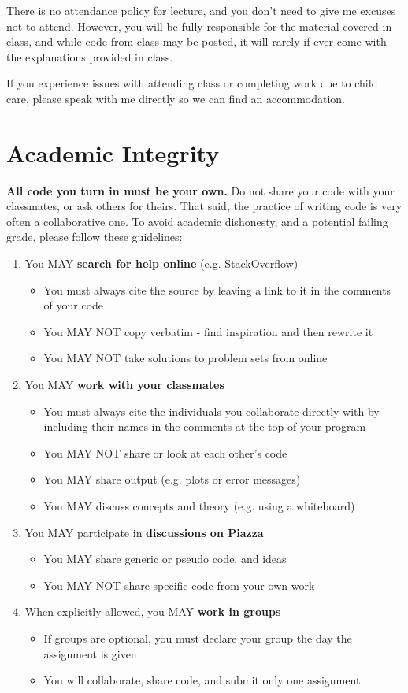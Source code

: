 \documentclass{article}
\begin{document}
There is no attendance policy for lecture, and you don't need to give me excuses not to attend.  However, you will be fully responsible for the material covered in class, and while code from class may be posted, it will rarely if ever come with the explanations provided in class.

If you experience issues with attending class or completing work due to child care, please speak with me directly so we can find an accommodation.

\section*{Academic Integrity}
\textbf{All code you turn in must be your own.}  Do not share your code with your classmates, or ask others for theirs.  That said, the practice of writing code is very often a collaborative one.  To avoid academic dishonesty, and a potential failing grade, please follow these guidelines:

\begin{enumerate}
	\item You MAY \textbf{search for help online} (e.g. StackOverflow)
	\begin{itemize}
		\item You must always cite the source by leaving a link to it in the comments of your code
		\item You MAY NOT copy verbatim - find inspiration and then rewrite it
		\item You MAY NOT take solutions to problem sets from online
	\end{itemize}
	\item You MAY \textbf{work with your classmates}
	\begin{itemize}
		\item You must always cite the individuals you collaborate directly with by including their names in the comments at the top of your program
		\item You MAY NOT share or look at each other's code
		\item You MAY share output (e.g. plots or error messages)
		\item You MAY discuss concepts and theory (e.g. using a whiteboard)
	\end{itemize}
	\item You MAY participate in \textbf{discussions on Piazza}
	\begin{itemize}
		\item You MAY share generic or pseudo code, and ideas
		\item You MAY NOT share specific code from your own work
	\end{itemize}
	\item When explicitly allowed, you MAY \textbf{work in groups}
	\begin{itemize}
		\item If groups are optional, you must declare your group the day the assignment is given
		\item You will collaborate, share code, and submit only one assignment
	\end{itemize}
\end{enumerate}
\end{document}
